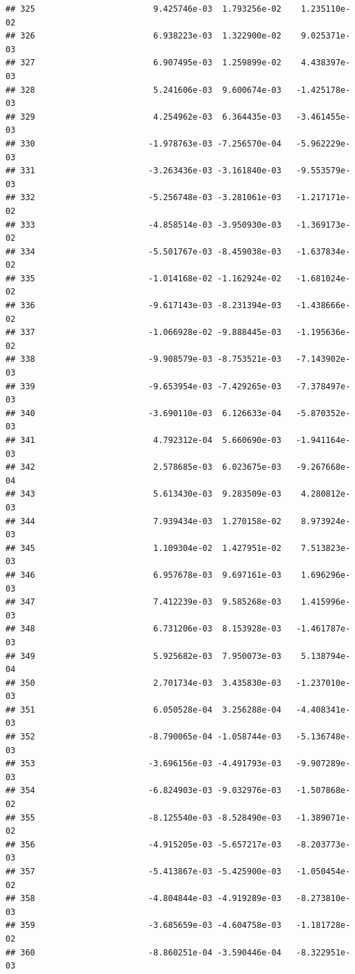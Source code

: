 \documentclass[
]{article}
\begin{document}
\begin{verbatim}
## 325                        9.425746e-03  1.793256e-02    1.235110e-02
## 326                        6.938223e-03  1.322900e-02    9.025371e-03
## 327                        6.907495e-03  1.259899e-02    4.438397e-03
## 328                        5.241606e-03  9.600674e-03   -1.425178e-03
## 329                        4.254962e-03  6.364435e-03   -3.461455e-03
## 330                       -1.978763e-03 -7.256570e-04   -5.962229e-03
## 331                       -3.263436e-03 -3.161840e-03   -9.553579e-03
## 332                       -5.256748e-03 -3.281061e-03   -1.217171e-02
## 333                       -4.858514e-03 -3.950930e-03   -1.369173e-02
## 334                       -5.501767e-03 -8.459038e-03   -1.637834e-02
## 335                       -1.014168e-02 -1.162924e-02   -1.681024e-02
## 336                       -9.617143e-03 -8.231394e-03   -1.438666e-02
## 337                       -1.066928e-02 -9.888445e-03   -1.195636e-02
## 338                       -9.908579e-03 -8.753521e-03   -7.143902e-03
## 339                       -9.653954e-03 -7.429265e-03   -7.378497e-03
## 340                       -3.690110e-03  6.126633e-04   -5.870352e-03
## 341                        4.792312e-04  5.660690e-03   -1.941164e-03
## 342                        2.578685e-03  6.023675e-03   -9.267668e-04
## 343                        5.613430e-03  9.283509e-03    4.280812e-03
## 344                        7.939434e-03  1.270158e-02    8.973924e-03
## 345                        1.109304e-02  1.427951e-02    7.513823e-03
## 346                        6.957678e-03  9.697161e-03    1.696296e-03
## 347                        7.412239e-03  9.585268e-03    1.415996e-03
## 348                        6.731206e-03  8.153928e-03   -1.461787e-03
## 349                        5.925682e-03  7.950073e-03    5.138794e-04
## 350                        2.701734e-03  3.435830e-03   -1.237010e-03
## 351                        6.050528e-04  3.256288e-04   -4.408341e-03
## 352                       -8.790065e-04 -1.058744e-03   -5.136748e-03
## 353                       -3.696156e-03 -4.491793e-03   -9.907289e-03
## 354                       -6.824903e-03 -9.032976e-03   -1.507868e-02
## 355                       -8.125540e-03 -8.528490e-03   -1.389071e-02
## 356                       -4.915205e-03 -5.657217e-03   -8.203773e-03
## 357                       -5.413867e-03 -5.425900e-03   -1.050454e-02
## 358                       -4.804844e-03 -4.919289e-03   -8.273810e-03
## 359                       -3.685659e-03 -4.604758e-03   -1.181728e-02
## 360                       -8.860251e-04 -3.590446e-04   -8.322951e-03

\end{verbatim}
\end{document}
